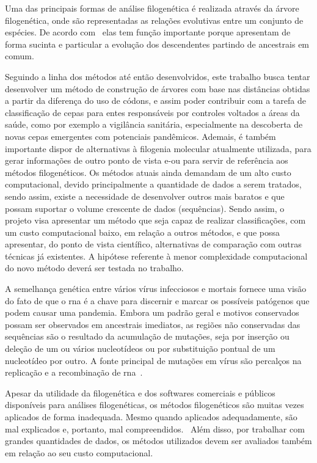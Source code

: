 Uma das principais formas de análise filogenética é realizada através da árvore filogenética, onde são representadas as relações evolutivas entre um conjunto de espécies. De acordo com~\citeauthor{morrison_tree_thinking} elas tem função importante porque apresentam de forma sucinta e particular a evolução dos descendentes partindo de ancestrais em comum.

Seguindo a linha dos métodos até então desenvolvidos, este trabalho busca tentar desenvolver um método de construção de árvores com base nas distâncias obtidas a partir da diferença do uso de códons, e assim poder contribuir com a tarefa de classificação de cepas para entes responsáveis por controles voltados a áreas da saúde, como por exemplo a vigilância sanitária, especialmente na descoberta de novas cepas emergentes com potenciais pandêmicos. Ademais, é também importante dispor de alternativas à filogenia molecular atualmente utilizada, para gerar informações de outro ponto de vista e-ou para servir de referência aos métodos filogenéticos.
Os métodos atuais ainda demandam de um alto custo computacional, devido principalmente a quantidade de dados a serem tratados, sendo assim, existe a necessidade de desenvolver outros mais baratos e que possam suportar o volume crescente de dados (sequências).
Sendo assim, o projeto visa apresentar um método que seja capaz de realizar classificações, com um custo computacional baixo, em relação a outros métodos, e que possa apresentar, do ponto de vista científico, alternativas de comparação com outras técnicas já existentes. A hipótese referente à menor complexidade computacional do novo método deverá ser testada no trabalho.

A semelhança genética entre vários vírus infecciosos e mortais fornece uma visão do fato de que o \gls{rna} é a chave para discernir e marcar os possíveis patógenos que podem causar uma pandemia. Embora um padrão geral e motivos conservados possam ser observados em ancestrais imediatos, as regiões não conservadas das sequências são o resultado da acumulação de mutações, seja por inserção ou deleção de um ou vários nucleotídeos ou por substituição pontual de um nucleotídeo por outro. A fonte principal de mutações em vírus são percalços na replicação e a recombinação de \gls{rna}~\cite{behl_threat_2022}.

Apesar da utilidade da filogenética e dos softwares comerciais e públicos disponíveis para análises filogenéticas, os métodos filogenéticos são muitas vezes aplicados de forma inadequada. Mesmo quando aplicados adequadamente, são mal explicados e, portanto, mal compreendidos.~\cite[p. 1]{barry_phylogenetic_analysis_2006} Além disso, por trabalhar com grandes quantidades de dados, os métodos utilizados devem ser avaliados também em relação ao seu custo computacional.

